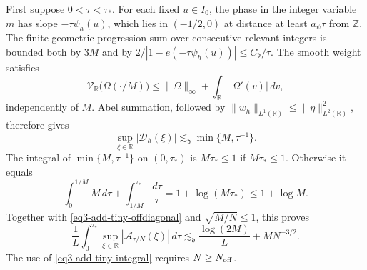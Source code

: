 \documentclass[reqno,12pt]{amsart}
\def \Z {\mathbb Z}
\def \R {\mathbb R}
\numberwithin{equation}{section}
\begin{document}
First suppose $0<\tau<\tau_*$. For each fixed $u\in I_0$, the
phase in the integer variable $m$ has slope $-\tau\psi_h(u)$,
which lies in $(-1/2,0)$ at distance at least $a_\psi\tau$ from
$\Z$. The finite geometric progression sum over consecutive relevant integers is
bounded both by $3M$ and by
$2/|1-e(-\tau\psi_h(u))|\le C_{\mathfrak d}/\tau$.
The smooth weight satisfies
\[
 \mathcal V_\R\bigl(\Omega(\cdot/M)\bigr)
 \le\|\Omega\|_\infty+\int_\R|\Omega'(v)|\,dv,
\]
independently of $M$. Abel summation, followed by
$\|w_h\|_{L^1(\R)}\le\|\eta\|_{L^2(\R)}^2$, therefore gives
\begin{equation}
 \sup_{\xi\in\R}|\mathcal D_h(\xi)|
       \lesssim_{\mathfrak d}\min\{M,\tau^{-1}\}.
 \label{eq3-add-tiny-diagonal}
\end{equation}
The integral of $\min\{M,\tau^{-1}\}$ on $(0,\tau_*)$ is
$M\tau_*\le1$ if $M\tau_*\le1$. Otherwise it equals
\[
 \int_0^{1/M}M\,d\tau+\int_{1/M}^{\tau_*}\frac{d\tau}{\tau}
 =1+\log(M\tau_*)\le1+\log M.
\]
Together with \eqref{eq3-add-tiny-offdiagonal} and
$\sqrt{M/N}\le1$, this proves
\begin{equation}
 \frac1L\int_0^{\tau_*}\sup_{\xi\in\R}
          |\mathcal A_{\tau/N}(\xi)|\,d\tau
 \lesssim_{\mathfrak d}\frac{\log(2M)}L+MN^{-3/2}.
 \label{eq3-add-tiny-integral}
\end{equation}
The use of \eqref{eq3-add-tiny-integral} requires $N\ge N_{\rm off}$.
\end{document}
